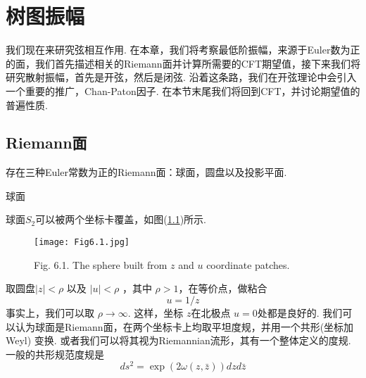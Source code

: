 \setcounter{section}{0}%
\setcounter{chapter}{5}

\chapter{树图振幅}
我们现在来研究弦相互作用. 在本章，我们将考察最低阶振幅，来源于Euler数为正的面，我们首先描述相关的Riemann面并计算所需要的CFT期望值，接下来我们将研究散射振幅，首先是开弦，然后是闭弦. 沿着这条路，我们在开弦理论中会引入一个重要的推广，Chan-Paton因子. 在本节末尾我们将回到CFT，并讨论期望值的普遍性质.
\section{Riemann面}
存在三种Euler常数为正的Riemann面：球面，圆盘以及投影平面.\\

\centerline{\Large 球面}
球面$S_2$可以被两个坐标卡覆盖，如图(\ref{Fig6.1})所示.
\begin{figure}
	\begin{center}
		\texttt{[image: Fig6.1.jpg]}\\
		\caption{Fig. 6.1. The sphere built from $z$ and $u$ coordinate patches.}\label{Fig6.1}
	\end{center}
\end{figure}
取圆盘$|z|<\rho$ 以及 $|u|<\rho$ ，其中 $\rho>1$，在等价点，做粘合
\begin{equation}
u=1 / z
\end{equation}
事实上，我们可以取 $\rho \rightarrow \infty$. 这样，坐标 $z$在北极点 $u=0$处都是良好的. 我们可以认为球面是Riemann面，在两个坐标卡上均取平坦度规，并用一个共形(坐标加Weyl) 变换. 或者我们可以将其视为Riemannian流形，其有一个整体定义的度规. 一般的共形规范度规是
\begin{equation}
	d s^{2}=\exp (2 \omega(z, \bar{z})) d z d \bar{z}
\end{equation}


